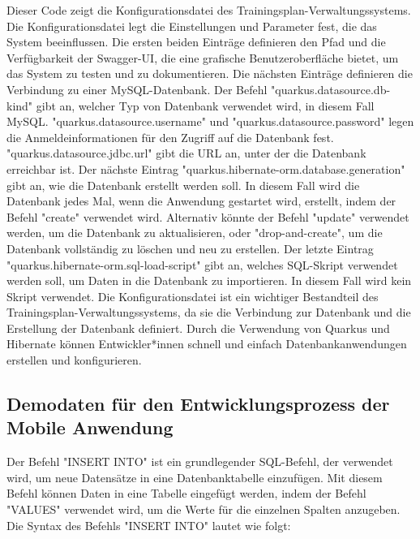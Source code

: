 Dieser Code zeigt die Konfigurationsdatei des Trainingsplan-Verwaltungssystems. Die Konfigurationsdatei legt die Einstellungen und Parameter fest, die das System beeinflussen. Die ersten beiden Einträge definieren den Pfad und die Verfügbarkeit der Swagger-UI, die eine grafische Benutzeroberfläche bietet, um das System zu testen und zu dokumentieren.
\newline
\newline
Die nächsten Einträge definieren die Verbindung zu einer MySQL-Datenbank. Der Befehl "quarkus.datasource.db-kind" gibt an, welcher Typ von Datenbank verwendet wird, in diesem Fall MySQL. "quarkus.datasource.username" und "quarkus.datasource.password" legen die Anmeldeinformationen für den Zugriff auf die Datenbank fest. "quarkus.datasource.jdbc.url" gibt die URL an, unter der die Datenbank erreichbar ist.
\newline
\newline
Der nächste Eintrag "quarkus.hibernate-orm.database.generation" gibt an, wie die Datenbank erstellt werden soll. In diesem Fall wird die Datenbank jedes Mal, wenn die Anwendung gestartet wird, erstellt, indem der Befehl "create" verwendet wird. Alternativ könnte der Befehl "update" verwendet werden, um die Datenbank zu aktualisieren, oder "drop-and-create", um die Datenbank vollständig zu löschen und neu zu erstellen.
\newline
\newline
Der letzte Eintrag "quarkus.hibernate-orm.sql-load-script" gibt an, welches SQL-Skript verwendet werden soll, um Daten in die Datenbank zu importieren. In diesem Fall wird kein Skript verwendet.
\newline
\newline
Die Konfigurationsdatei ist ein wichtiger Bestandteil des Trainingsplan-Verwaltungssystems, da sie die Verbindung zur Datenbank und die Erstellung der Datenbank definiert. Durch die Verwendung von Quarkus und Hibernate können Entwickler*innen schnell und einfach Datenbankanwendungen erstellen und konfigurieren.

\subsection{Demodaten für den Entwicklungsprozess der Mobile Anwendung}

Der Befehl "INSERT INTO" ist ein grundlegender SQL-Befehl, der verwendet wird, um neue Datensätze in eine Datenbanktabelle einzufügen. Mit diesem Befehl können Daten in eine Tabelle eingefügt werden, indem der Befehl "VALUES" verwendet wird, um die Werte für die einzelnen Spalten anzugeben.
\newline
\newline
Die Syntax des Befehls "INSERT INTO" lautet wie folgt:

